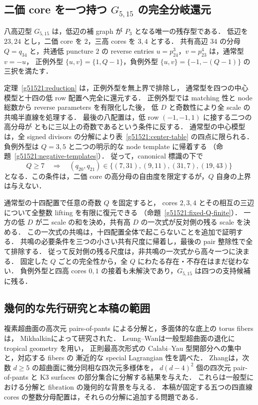 \subsection{二価 core を一つ持つ \texorpdfstring{$G_{5,15}$}{G5,15} の完全分岐還元}

八高辺型 $G_{5,15}$ は，低辺の補 graph が $P_3$ となる唯一の残存型である．
低辺を $23,24$ とし，二価 core を $2$，三高 cores を $3,4$ とする．
共有高辺 $34$ の分母 $Q=q_{34}$ と，共通低 puncture $2$ の reverse entries
$u=p^3_{24}$，$v=p^4_{23}$ は，通常型 $v=-u$，
正例外型 $\{u,v\}=\{1,Q-1\}$，負例外型 $\{u,v\}=\{-1,-(Q-1)\}$ の三択を満たす．

定理~\ref{g51521:reduction} は，正例外型を無上界で排除し，
通常型を四つの中心模型と十四の低 row 配置へ完全に還元する．
正例外型では matching 性と node 総数から reverse parameters を有限化した後，
低 $D$ と奇数性により全 scale の共鳴半直線を処理する．
最後の八配置は，低 row $(-1,-1,1)$ に接する二つの高分母が
ともに三以上の奇数であるという条件に反する．
通常型の中心模型は，全 signed divisors の分解により表~\ref{g51521:center-table} の四点に限られる．
負例外型は $Q=3,5$ と二つの明示的な node template に帰着する
（命題~\ref{g51521:negative-templates}）．
従って，canonical 標識の下で
\[
 Q\ge7\quad\Longrightarrow\quad
 (q_{20},q_{21})\in\{(7,31),(9,11),(31,7),(19,43)\}
\]
となる．この条件は，二価 core の高分母の自由度を限定するが，$Q$ 自身の上界は与えない．

通常型の十四配置で任意の奇数 $Q$ を固定すると，
cores $2,3,4$ とその相互の三辺について全整数 lifting を有限に復元できる
（命題~\ref{g51521:fixed-Q-finite}）．
一方の低 $D$ が二 scale の和を決め，共有高 $D$ の一次式が反対側の残る scale を決める．
この一次式の共鳴は，十四配置全体で起こらないことを追加で証明する．
共鳴の必要条件を三つの小さい共有尺度に帰着し，最後の pair 整除性で全て排除する．
従って反対側の残る尺度は，非共鳴の一次式から高々一つに決まる．
固定した $Q$ ごとの完全性から，全 $Q$ にわたる存在・不存在はまだ従わない．
負例外型と四高 cores $0,1$ の接着も未解決であり，$G_{5,15}$ は四つの支持候補に残る．

\subsection{幾何的な先行研究と本稿の範囲}

複素超曲面の高次元 pairs-of-pants による分解と，多面体的な底上の torus fibers は，
Mikhalkin\cite[Theorems~1 and~1$'$]{Mikhalkin}によって研究された．
Leung--Wan\cite{LeungWan}は一般型超曲面の退化に tropical geometry を用い，
正則最高次形式の Calabi--Yau 型開部分への集中と，対応する fibers の
漸近的な special Lagrangian 性を調べた．
Zhang\cite[Theorem~1.1]{Zhang}は，次数 $d\ge5$ の超曲面に微分同相な四次元多様体を，
$d(d-4)^2$ 個の四次元 pair-of-pants と K3 surfaces の部分集合に分解する結果を与えた．
これらは一般型における分解と fibration の幾何的な背景を与える．
本稿が固定する五つの四直線 cores の整数分母配置は，それらの分解に追加する問題である．

